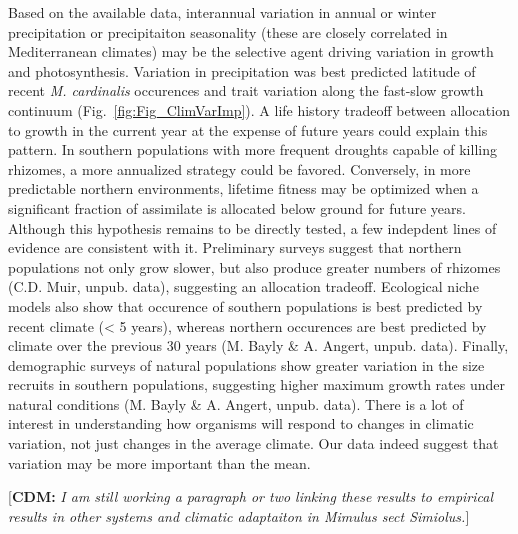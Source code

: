 \documentclass[11pt, oneside]{article}
\newcommand{\cdm}[1]{{ \color{magenta} [{\bf{CDM:}} {\em#1}]}} %
\begin{document}
Based on the available data, interannual variation in annual or winter precipitation or precipitaiton seasonality (these are closely correlated in Mediterranean climates) may be the selective agent driving variation in growth and photosynthesis. Variation in precipitation was best predicted latitude of recent \textit{M. cardinalis} occurences and trait variation along the fast-slow growth continuum (Fig.~\ref{fig:Fig_ClimVarImp}). A life history tradeoff between allocation to growth in the current year at the expense of future years could explain this pattern. In southern populations with more frequent droughts capable of killing rhizomes, a more annualized strategy could be favored. Conversely, in more predictable northern environments, lifetime fitness may be optimized when a significant fraction of assimilate is allocated below ground for future years. Although this hypothesis remains to be directly tested, a few indepdent lines of evidence are consistent with it. Preliminary surveys suggest that northern populations not only grow slower, but also produce greater numbers of rhizomes (C.D. Muir, unpub. data), suggesting an allocation tradeoff. Ecological niche models also show that occurence of southern populations is best predicted by recent climate (< 5 years), whereas northern occurences are best predicted by climate over the previous 30 years (M. Bayly \& A. Angert, unpub. data). Finally, demographic surveys of natural populations show greater variation in the size recruits in southern populations, suggesting higher maximum growth rates under natural conditions (M. Bayly \& A. Angert, unpub. data). There is a lot of interest in understanding how organisms will respond to changes in climatic variation, not just changes in the average climate. Our data indeed suggest that variation may be more important than the mean. 

\cdm{I am still working a paragraph or two linking these results to empirical results in other systems and climatic adaptaiton in Mimulus sect Simiolus.}

\end{document}

